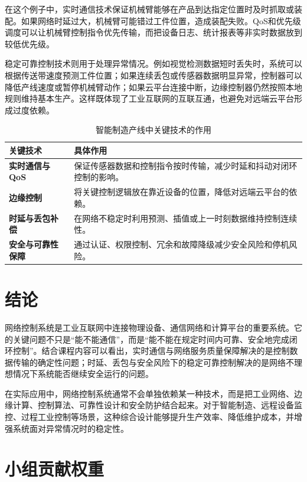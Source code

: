 \documentclass[UTF8,a4paper,zihao=-4]{ctexart}
\begin{document}
在这个例子中，实时通信技术保证机械臂能够在产品到达指定位置时及时抓取或装配。如果网络时延过大，机械臂可能错过工件位置，造成装配失败。QoS和优先级调度可以让机械臂控制指令优先传输，而把设备日志、统计报表等非实时数据放到较低优先级。

稳定可靠控制技术则用于处理异常情况。例如视觉检测数据短时丢失时，系统可以根据传送带速度预测工件位置；如果连续丢包或传感器数据明显异常，控制器可以降低产线速度或暂停机械臂动作；如果云平台连接中断，边缘控制器仍然按照本地规则维持基本生产。这样既体现了工业互联网的互联互通，也避免对远端云平台形成过度依赖。

\begin{table}[htbp]
  \centering
  \caption{智能制造产线中关键技术的作用}
  \begin{tabularx}{0.92\textwidth}{>{\bfseries}p{3.2cm}X}
    \toprule
    关键技术 & 具体作用 \\
    \midrule
    实时通信与QoS & 保证传感器数据和控制指令按时传输，减少时延和抖动对闭环控制的影响。 \\
    边缘控制 & 将关键控制逻辑放在靠近设备的位置，降低对远端云平台的依赖。 \\
    时延与丢包补偿 & 在网络不稳定时利用预测、插值或上一时刻数据维持控制连续性。 \\
    安全与可靠性保障 & 通过认证、权限控制、冗余和故障降级减少安全风险和停机风险。 \\
    \bottomrule
  \end{tabularx}
\end{table}

\section{结论}

网络控制系统是工业互联网中连接物理设备、通信网络和计算平台的重要系统。它的关键问题不只是“能不能通信”，而是“能不能在规定时间内可靠、安全地完成闭环控制”。结合课程内容可以看出，实时通信与网络服务质量保障解决的是控制数据传输的确定性问题；时延、丢包与安全风险下的稳定可靠控制解决的是网络不理想情况下系统能否继续安全运行的问题。

在实际应用中，网络控制系统通常不会单独依赖某一种技术，而是把工业网络、边缘计算、控制算法、可靠性设计和安全防护结合起来。对于智能制造、远程设备监控、过程工业控制等场景，这种综合设计能够提升生产效率、降低维护成本，并增强系统面对异常情况时的稳定性。

\clearpage
\section*{小组贡献权重}
\end{document}
